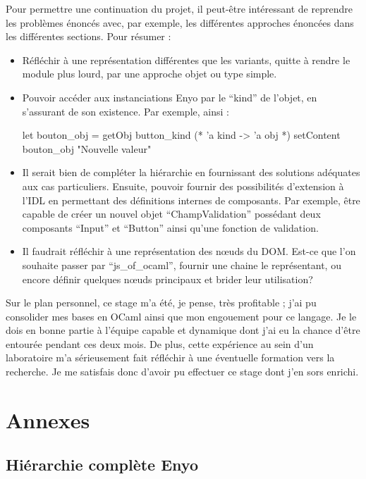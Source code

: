 \documentclass[11pt,a4paper]{report}
\begin{document}
Pour permettre une continuation du projet, il peut-être intéressant de reprendre les problèmes
énoncés avec, par exemple, les différentes approches énoncées dans les différentes sections. Pour résumer :
\begin{itemize}
\item Réfléchir à une représentation différentes que les variants, quitte à rendre le
  module plus lourd, par une approche objet ou type simple.
\item Pouvoir accéder aux instanciations Enyo par le ``kind'' de l'objet, en s'assurant
  de son existence. Par exemple, ainsi :
  \begin{OCaml}
    let bouton_obj = getObj button_kind (* 'a kind -> 'a obj *)
    setContent bouton_obj "Nouvelle valeur"
  \end{OCaml}
\item Il serait bien de compléter la hiérarchie en fournissant des solutions adéquates
  aux cas particuliers. Ensuite, pouvoir fournir des possibilités d'extension à l'IDL en permettant 
  des définitions internes de composants. Par exemple, être capable  de créer un nouvel objet ``ChampValidation'' 
  possédant deux composants ``Input'' et ``Button'' ainsi qu'une fonction de validation.
\item Il faudrait réfléchir à une représentation des n\oe{}uds du DOM. Est-ce que l'on souhaite passer 
  par ``js\_of\_ocaml'', fournir une chaine le représentant, ou encore définir quelques n\oe{}uds principaux
  et brider leur utilisation?
\end{itemize}\medskip

Sur le plan personnel, ce stage m'a été, je pense, très profitable ; j'ai pu consolider mes bases en OCaml
ainsi que mon engouement pour ce langage. Je le dois en bonne partie à l'équipe capable et dynamique
dont j'ai eu la chance d'être entourée pendant ces deux mois.
De plus, cette expérience au sein d'un laboratoire m'a sérieusement fait réfléchir à 
une éventuelle formation vers la recherche.
Je me satisfais donc d'avoir pu effectuer ce stage dont j'en sors enrichi.

\chapter{Annexes}

\section{Hiérarchie complète Enyo}\label{hier-complet}
\end{document}
